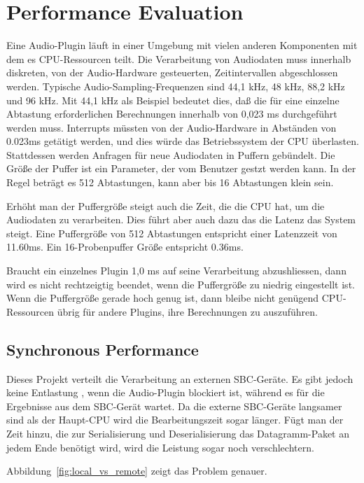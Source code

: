 \section{Performance Evaluation}

Eine Audio-Plugin läuft in einer Umgebung mit vielen anderen Komponenten mit dem es CPU-Ressourcen teilt. Die Verarbeitung von Audiodaten muss innerhalb diskreten, von der Audio-Hardware gesteuerten, Zeitintervallen abgeschlossen werden. Typische Audio-Sampling-Frequenzen sind 44,1 kHz, 48 kHz, 88,2 kHz und 96 kHz. Mit 44,1 kHz als Beispiel bedeutet dies, daß die für eine einzelne Abtastung erforderlichen Berechnungen innerhalb von 0,023 ms durchgeführt werden muss. Interrupts müssten von der Audio-Hardware in Abständen von 0.023ms getätigt werden, und dies würde das Betriebssystem der CPU überlasten. Stattdessen werden Anfragen für neue Audiodaten in Puffern gebündelt. Die Größe der Puffer ist ein Parameter, der vom Benutzer gestzt werden kann. In der Regel beträgt es 512 Abtastungen, kann aber bis 16 Abtastungen klein sein.

Erhöht man der Puffergröße steigt auch die Zeit, die die CPU hat, um die Audiodaten zu verarbeiten. Dies führt aber auch dazu das  die Latenz das System steigt. Eine Puffergröße von 512 Abtastungen entspricht einer Latenzzeit von 11.60ms. Ein 16-Probenpuffer Größe entspricht 0.36ms.

Braucht ein einzelnes Plugin 1,0 ms auf seine Verarbeitung abzushliessen, dann wird es nicht rechtzeigtig beendet, wenn die Puffergröße zu niedrig eingestellt ist. Wenn die Puffergröße gerade hoch genug ist, dann bleibe nicht genügend CPU-Ressourcen übrig für andere Plugins, ihre Berechnungen zu auszuführen.

\subsection{Synchronous Performance}

Dieses Projekt verteilt die Verarbeitung an externen SBC-Geräte. Es gibt jedoch keine Entlastung , wenn die Audio-Plugin blockiert ist, während es für die Ergebnisse aus dem SBC-Gerät wartet. Da die externe SBC-Geräte langsamer sind als der Haupt-CPU wird die Bearbeitungszeit sogar länger. Fügt man der Zeit hinzu, die zur Serialisierung und Deserialisierung das Datagramm-Paket an jedem Ende benötigt wird, wird die Leistung sogar noch verschlechtern.

Abbildung~\ref{fig:local_vs_remote} zeigt das Problem genauer.

